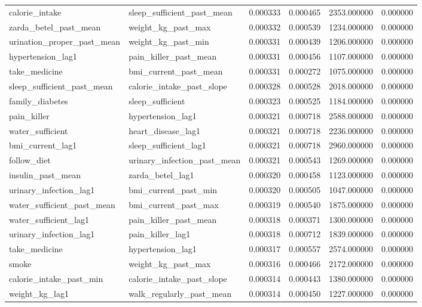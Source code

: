 \begin{longtable}{llrrrr}
calorie\_intake & sleep\_sufficient\_past\_mean & 0.000333 & 0.000465 & 2353.000000 & 0.000000 \\
zarda\_betel\_past\_mean & weight\_kg\_past\_max & 0.000332 & 0.000539 & 1234.000000 & 0.000000 \\
urination\_proper\_past\_mean & weight\_kg\_past\_min & 0.000331 & 0.000439 & 1206.000000 & 0.000000 \\
hypertension\_lag1 & pain\_killer\_past\_mean & 0.000331 & 0.000456 & 1107.000000 & 0.000000 \\
take\_medicine & bmi\_current\_past\_mean & 0.000331 & 0.000272 & 1075.000000 & 0.000000 \\
sleep\_sufficient\_past\_mean & calorie\_intake\_past\_slope & 0.000328 & 0.000528 & 2018.000000 & 0.000000 \\
family\_diabetes & sleep\_sufficient & 0.000323 & 0.000525 & 1184.000000 & 0.000000 \\
pain\_killer & hypertension\_lag1 & 0.000321 & 0.000718 & 2588.000000 & 0.000000 \\
water\_sufficient & heart\_disease\_lag1 & 0.000321 & 0.000718 & 2236.000000 & 0.000000 \\
bmi\_current\_lag1 & sleep\_sufficient\_lag1 & 0.000321 & 0.000718 & 2960.000000 & 0.000000 \\
follow\_diet & urinary\_infection\_past\_mean & 0.000321 & 0.000543 & 1269.000000 & 0.000000 \\
insulin\_past\_mean & zarda\_betel\_lag1 & 0.000320 & 0.000458 & 1123.000000 & 0.000000 \\
urinary\_infection\_lag1 & bmi\_current\_past\_min & 0.000320 & 0.000505 & 1047.000000 & 0.000000 \\
water\_sufficient\_past\_mean & bmi\_current\_past\_max & 0.000319 & 0.000540 & 1875.000000 & 0.000000 \\
water\_sufficient\_lag1 & pain\_killer\_past\_mean & 0.000318 & 0.000371 & 1300.000000 & 0.000000 \\
urinary\_infection\_lag1 & pain\_killer\_lag1 & 0.000318 & 0.000712 & 1839.000000 & 0.000000 \\
take\_medicine & hypertension\_lag1 & 0.000317 & 0.000557 & 2574.000000 & 0.000000 \\
smoke & weight\_kg\_past\_max & 0.000316 & 0.000466 & 2172.000000 & 0.000000 \\
calorie\_intake\_past\_min & calorie\_intake\_past\_slope & 0.000314 & 0.000443 & 1380.000000 & 0.000000 \\
weight\_kg\_lag1 & walk\_regularly\_past\_mean & 0.000314 & 0.000450 & 1227.000000 & 0.000000 \\

\end{longtable}
